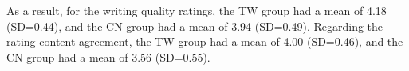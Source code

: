 As a result, for the writing quality ratings, the TW group had a mean of 4.18 (SD=0.44), and the CN group had a mean of 3.94 (SD=0.49). 
Regarding the rating-content agreement, the TW group had a mean of 4.00 (SD=0.46), and the CN group had a mean of 3.56 (SD=0.55).




